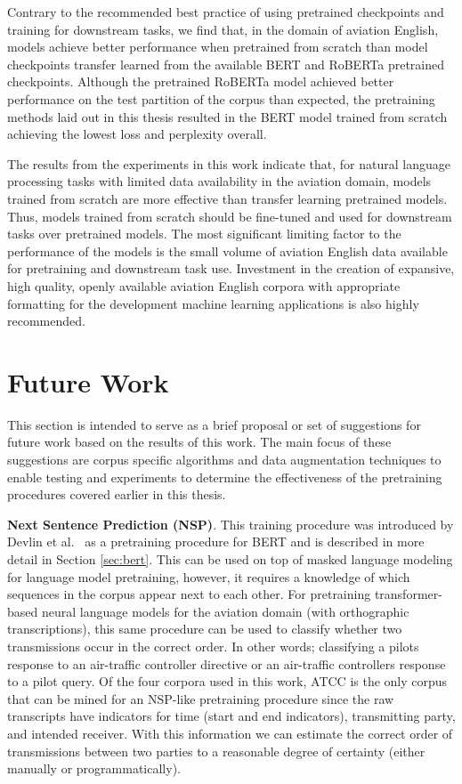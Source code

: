 \documentclass[12pt]{article}
\begin{document}
Contrary to the recommended best practice of using pretrained checkpoints and training for downstream tasks, we find that, in the domain of aviation
English, models achieve better performance when pretrained from scratch than model checkpoints transfer learned from the available BERT and RoBERTa
pretrained checkpoints. Although the pretrained RoBERTa model achieved better performance on the test partition of the corpus than expected, the
pretraining methods laid out in this thesis resulted in the BERT model trained from scratch achieving the lowest loss and perplexity overall.

The results from the experiments in this work indicate that, for natural language processing tasks with limited data availability in the aviation
domain, models trained from scratch are more effective than transfer learning pretrained models. Thus, models trained from scratch should be
fine-tuned and used for downstream tasks over pretrained models. The most significant limiting factor to the performance of the models is the small
volume of aviation English data available for pretraining and downstream task use. Investment in the creation of expansive, high quality, openly
available aviation English corpora with appropriate formatting for the development machine learning applications is also highly recommended.

\section{Future Work}\label{sec:future_work}
This section is intended to serve as a brief proposal or set of suggestions for future work based on the results of this work. The main focus of these
suggestions are corpus specific algorithms and data augmentation techniques to enable testing and experiments to determine the effectiveness of the
pretraining procedures covered earlier in this thesis.

\textbf{Next Sentence Prediction (NSP)}. This training procedure was introduced by Devlin et al.~\cite{devlin_bert_2019} as a pretraining procedure
for BERT and is described in more detail in Section \ref{sec:bert}. This can be used on top of masked language modeling for language model
pretraining, however, it requires a knowledge of which sequences in the corpus appear next to each other. For pretraining transformer-based neural
language models for the aviation domain (with orthographic transcriptions), this same procedure can be used to classify whether two transmissions
occur in the correct order. In other words; classifying a pilots response to an air-traffic controller directive or an air-traffic controllers
response to a pilot query. Of the four corpora used in this work, ATCC is the only corpus that can be mined for an NSP-like pretraining procedure
since the raw transcripts have indicators for time (start and end indicators), transmitting party, and intended receiver. With this information we can
estimate the correct order of transmissions between two parties to a reasonable degree of certainty (either manually or programmatically).
\end{document}
